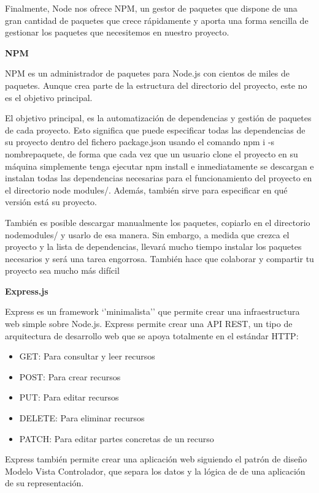 Finalmente, Node nos ofrece NPM, un gestor de paquetes que dispone de una gran cantidad de paquetes que crece rápidamente y aporta una forma sencilla de gestionar los paquetes que necesitemos en nuestro proyecto.


{\bf NPM}

NPM es un administrador de paquetes para Node.js con cientos de miles de paquetes. Aunque crea parte de la estructura del directorio del proyecto, este no es el objetivo principal.

El objetivo principal, es la automatización de dependencias y gestión de paquetes de cada proyecto. Esto significa que puede especificar todas las dependencias de su proyecto dentro del fichero package.json usando el comando npm i -s nombrepaquete, de forma que cada vez que un usuario clone el proyecto en su máquina simplemente tenga ejecutar npm install e inmediatamente se descargan e instalan todas las dependencias necesarias para el funcionamiento del proyecto en el directorio node modules/. Además, también sirve para especificar en qué versión está su proyecto.

También es posible descargar manualmente los paquetes, copiarlo en el directorio nodemodules/ y usarlo de esa manera. Sin embargo, a medida que crezca el proyecto y la lista de dependencias, llevará mucho tiempo instalar los paquetes necesarios y será una tarea engorrosa. También hace que colaborar y compartir tu proyecto sea mucho más difícil

{\bf Express.js}

Express es un framework ‘’minimalista’’ que permite crear una infraestructura web simple sobre Node.js. Express permite crear una API REST, un tipo de arquitectura de desarrollo web que se apoya totalmente en el estándar HTTP:

\begin{itemize}
  \item GET: Para consultar y leer recursos
  \item POST: Para crear recursos
  \item PUT: Para editar recursos
  \item DELETE: Para eliminar recursos
  \item PATCH: Para editar partes concretas de un recurso
\end{itemize}

Express también permite crear una aplicación web siguiendo el patrón de diseño Modelo Vista Controlador, que separa los datos y la lógica de de una aplicación de su representación.


